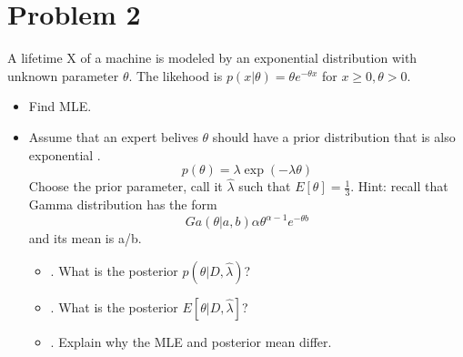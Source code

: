 \documentclass[conference, onecolumn]{IEEEtran}
\begin{document}
	\section*{Problem 2}
	A lifetime X of a machine is modeled by an exponential distribution with
	unknown parameter $\theta$. The likehood is $p(x|\theta) = \theta e^{- \theta x}$ for $x \geq 0, \theta > 0$.
	\begin{itemize}
		\item [(a)] Find MLE.
		\item [(b)] Assume that an expert belives $\theta$ should have a prior distribution that is also exponential
		.\begin{equation}
			p (\theta) = \lambda \exp({-\lambda \theta})
		\end{equation}
		Choose the prior parameter, call it $\hat{\lambda}$ such that $E [\theta] = \frac{1}{3}$. Hint: recall that Gamma distribution has the form
		\begin{equation}
			Ga(\theta|a,b) \alpha \theta^{\alpha -1} e^{-\theta b}
		\end{equation}
		and its mean is a/b.
		\begin{itemize}
			\item [i]. What is the posterior $p (\theta|D,\hat{\lambda})$?
			\item [ii]. What is the posterior $E [\theta|D,\hat{\lambda}]$?
			\item [iii]. Explain why the MLE and posterior mean differ.
		\end{itemize}
	\end{itemize}
	
\end{document}
